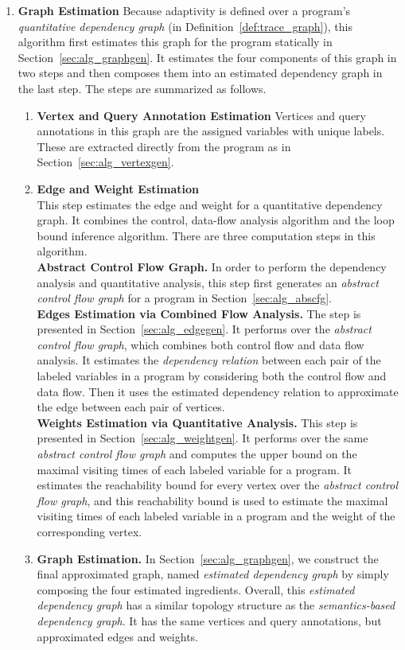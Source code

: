\begin{enumerate}
  \item \textbf{Graph Estimation}
  Because adaptivity is defined over a program's \emph{quantitative dependency graph} (in Definition~\ref{def:trace_graph}),
  this algorithm first estimates this graph for the program statically
  in Section~\ref{sec:alg_graphgen}.
  It estimates the four components of this graph in two steps and then composes them into an estimated dependency graph
  in the last step.
  The steps are summarized  as follows.
\begin{enumerate}
  \item \textbf{Vertex and Query Annotation Estimation}
  Vertices and query annotations in this graph are the assigned variables with unique labels. These are extracted directly from the program as in Section~\ref{sec:alg_vertexgen}.
  \item \textbf{Edge and Weight Estimation}
  \\
  This step estimates the edge and weight for a quantitative dependency graph. It combines the control, data-flow  analysis algorithm and the loop bound inference algorithm.
  There are three computation steps in this algorithm.
  \\
  \textbf{Abstract Control Flow Graph.}
  In order to perform the dependency analysis and quantitative analysis, this step first generates an \emph{abstract control flow graph} for a program in Section~\ref{sec:alg_abscfg}.
  \\
  \textbf{Edges Estimation via Combined Flow Analysis.} 
  The step is presented in
  Section~\ref{sec:alg_edgegen}. It performs over the \emph{abstract control flow graph}, which combines both control flow and data flow analysis.
  It estimates the \emph{dependency relation} between each pair of the labeled variables in a program by considering both the control flow and data flow.
  Then it uses the estimated dependency relation to approximate the edge
  between each pair of vertices.
  \\
  \textbf{Weights Estimation via Quantitative Analysis.} 
  This step is presented in Section~\ref{sec:alg_weightgen}. 
  It performs over the same \emph{abstract control flow graph} and computes the upper bound on the maximal visiting times of each labeled variable for a program.
  It estimates the reachability bound for every vertex over the \emph{abstract control flow graph},
  and this reachability bound is used to estimate the maximal visiting times of each labeled variable in a program and the weight of the corresponding vertex.
\item  \textbf{Graph Estimation.} 
In Section~\ref{sec:alg_graphgen}, we construct the final approximated graph,
named \emph{estimated dependency graph} by simply composing the four estimated ingredients. 
Overall, this \emph{estimated dependency graph} has a similar topology structure as 
the \emph{semantics-based dependency graph}. It has the same
vertices and query annotations, but approximated edges and weights. 
\end{enumerate}


\end{enumerate}
